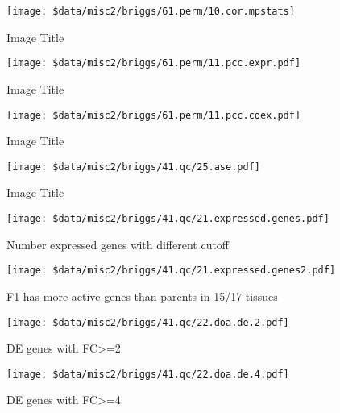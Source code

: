 \documentclass[11pt,]{article}
\begin{document}
\begin{figure}
\centering
\texttt{[image: \$data/misc2/briggs/61.perm/10.cor.mpstats]}
\caption{Image Title}
\end{figure}

\begin{figure}
\centering
\texttt{[image: \$data/misc2/briggs/61.perm/11.pcc.expr.pdf]}
\caption{Image Title}
\end{figure}

\begin{figure}
\centering
\texttt{[image: \$data/misc2/briggs/61.perm/11.pcc.coex.pdf]}
\caption{Image Title}
\end{figure}

\begin{figure}
\centering
\texttt{[image: \$data/misc2/briggs/41.qc/25.ase.pdf]}
\caption{Image Title}
\end{figure}

\begin{figure}
\centering
\texttt{[image: \$data/misc2/briggs/41.qc/21.expressed.genes.pdf]}
\caption{Number expressed genes with different cutoff}
\end{figure}

\begin{figure}
\centering
\texttt{[image: \$data/misc2/briggs/41.qc/21.expressed.genes2.pdf]}
\caption{F1 has more active genes than parents in 15/17 tissues}
\end{figure}

\begin{figure}
\centering
\texttt{[image: \$data/misc2/briggs/41.qc/22.doa.de.2.pdf]}
\caption{DE genes with FC\textgreater{}=2}
\end{figure}

\begin{figure}
\centering
\texttt{[image: \$data/misc2/briggs/41.qc/22.doa.de.4.pdf]}
\caption{DE genes with FC\textgreater{}=4}
\end{figure}
\newpage
\singlespacing 
\end{document}
